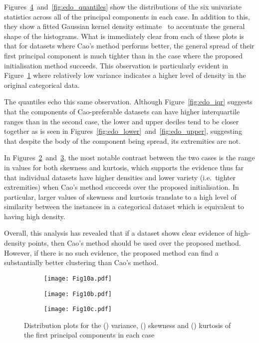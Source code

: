 Figures~\ref{fig:edo_moments}~and~\ref{fig:edo_quantiles} show the distributions
of the six univariate statistics across all of the principal components in each
case. In addition to this, they show a fitted Gaussian kernel density
estimate~\cite{Bashtannyk2001} to accentuate the general shape of the
histograms. What is immediately clear from each of these plots is that for
datasets where Cao's method performs better, the general spread of their first
principal component is much tighter than in the case where the proposed
initialisation method succeeds. This observation is particularly evident in
Figure~\ref{fig:edo_variance} where relatively low variance indicates a higher
level of density in the original categorical data.

The quantiles echo this same observation. Although Figure~\ref{fig:edo_iqr}
suggests that the components of Cao-preferable datasets can have higher
interquartile ranges than in the second case, the lower and upper deciles tend
to be closer together as is seen in
Figures~\ref{fig:edo_lower}~and~\ref{fig:edo_upper}, suggesting that despite the
body of the component being spread, its extremities are not.

In Figures~\ref{fig:edo_skewness}~and~\ref{fig:edo_kurtosis}, the most notable
contrast between the two cases is the range in values for both skewness and
kurtosis, which supports the evidence thus far that individual datasets have
higher densities and lower variety (i.e.\ tighter extremities) when Cao's method
succeeds over the proposed initialisation. In particular, larger values of
skewness and kurtosis translate to a high level of similarity between the
instances in a categorical dataset which is equivalent to having high density.

Overall, this analysis has revealed that if a dataset shows clear evidence of
high-density points, then Cao's method should be used over the proposed method.
However, if there is no such evidence, the proposed method can find a
substantially better clustering than Cao's method.

\begin{figure}
    \centering
    \begin{subfigure}{\imgwidth}
        \texttt{[image: Fig10a.pdf]}%
        \caption{}\label{fig:edo_variance}
    \end{subfigure}

    \begin{subfigure}{\imgwidth}
        \texttt{[image: Fig10b.pdf]}%
    \caption{}\label{fig:edo_skewness}
    \end{subfigure}

    \begin{subfigure}{\imgwidth}
        \texttt{[image: Fig10c.pdf]}%
        \caption{}\label{fig:edo_kurtosis}
    \end{subfigure}
    \caption{Distribution plots for the () variance,
        () skewness and ()
        kurtosis of the first principal components in each
        case}\label{fig:edo_moments}
\end{figure}

